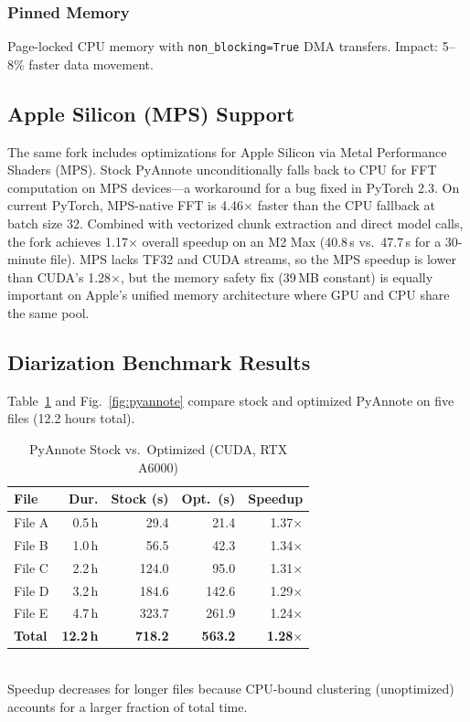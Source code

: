 \documentclass[conference,10pt]{IEEEtran}
\begin{document}
\subsubsection{Pinned Memory}
Page-locked CPU memory with \texttt{non\_blocking=True} DMA transfers.
Impact: 5--8\% faster data movement.

\subsection{Apple Silicon (MPS) Support}

The same fork includes optimizations for Apple Silicon via Metal Performance
Shaders (MPS). Stock PyAnnote unconditionally falls back to CPU for FFT
computation on MPS devices---a workaround for a bug fixed in PyTorch 2.3. On
current PyTorch, MPS-native FFT is 4.46$\times$ faster than the CPU fallback
at batch size 32. Combined with vectorized chunk extraction and direct model
calls, the fork achieves 1.17$\times$ overall speedup on an M2 Max (40.8\,s
vs.\ 47.7\,s for a 30-minute file). MPS lacks TF32 and CUDA streams, so the
MPS speedup is lower than CUDA's 1.28$\times$, but the memory safety fix
(39\,MB constant) is equally important on Apple's unified memory architecture
where GPU and CPU share the same pool.

\subsection{Diarization Benchmark Results}

Table~\ref{tab:pyannote} and Fig.~\ref{fig:pyannote} compare stock and optimized
PyAnnote on five files (12.2 hours total).

\begin{table}[!t]
\centering
\caption{PyAnnote Stock vs.\ Optimized (CUDA, RTX A6000)}
\label{tab:pyannote}
\begin{tabular}{@{}lrrrr@{}}
\toprule
\textbf{File} & \textbf{Dur.} & \textbf{Stock (s)} & \textbf{Opt.\ (s)} & \textbf{Speedup} \\
\midrule
File A &  0.5\,h &  29.4 &  21.4 & 1.37$\times$ \\
File B &  1.0\,h &  56.5 &  42.3 & 1.34$\times$ \\
File C &  2.2\,h & 124.0 &  95.0 & 1.31$\times$ \\
File D &  3.2\,h & 184.6 & 142.6 & 1.29$\times$ \\
File E &  4.7\,h & 323.7 & 261.9 & 1.24$\times$ \\
\midrule
\textbf{Total} & \textbf{12.2\,h} & \textbf{718.2} & \textbf{563.2} & \textbf{1.28$\times$} \\
\bottomrule
\end{tabular}
\\[4pt]
{\footnotesize Speedup decreases for longer files because CPU-bound clustering
  (unoptimized) accounts for a larger fraction of total time.}
\end{table}
\end{document}
